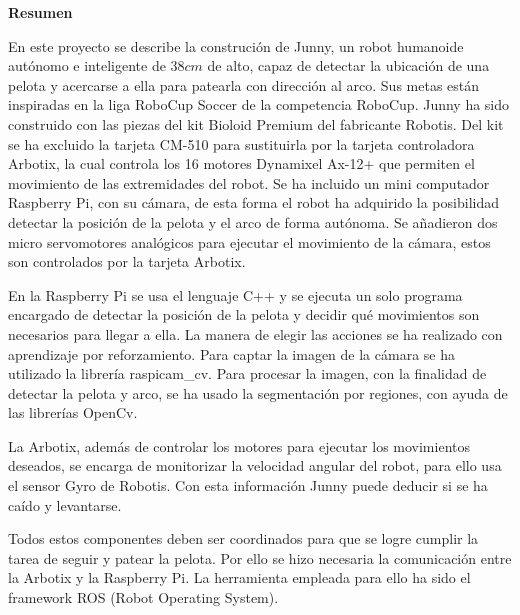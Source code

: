 \setcounter{page}{4}
\begin{center}
	{\bf Resumen}  %
\end{center}	


En este proyecto se describe la construción de Junny, un robot humanoide autónomo e inteligente de $38 cm $ de alto, capaz de detectar la ubicación de una pelota y acercarse a ella para patearla con dirección al arco. Sus metas están inspiradas en la liga RoboCup Soccer de la competencia RoboCup.
Junny ha sido construido con las piezas del kit Bioloid Premium del fabricante Robotis. Del kit se ha excluido la tarjeta CM-510 para sustituirla por la tarjeta controladora Arbotix, la cual controla los 16 motores Dynamixel Ax-12+ que permiten el movimiento de las extremidades del robot. Se ha incluido un mini computador Raspberry Pi, con su cámara, %
de esta forma el robot ha adquirido la posibilidad detectar la posición de la pelota y el arco de forma autónoma. Se añadieron dos micro servomotores analógicos para ejecutar el movimiento de la c\'amara, estos son controlados por la tarjeta Arbotix. 

En la Raspberry Pi se usa el lenguaje \gls{C++} y se ejecuta un solo programa encargado de detectar la posición de la pelota y decidir qué movimientos son necesarios para llegar a ella. La manera de elegir las acciones se ha realizado con aprendizaje por reforzamiento. Para captar la imagen de la cámara se ha utilizado la librería raspicam\_cv. Para procesar la imagen, con la finalidad de detectar la pelota y arco, se ha usado la segmentaci\'on por regiones, con ayuda de las librerías OpenCv. %

La Arbotix, además de controlar los motores para ejecutar los movimientos deseados, se encarga de monitorizar la velocidad angular del robot, para ello usa el sensor Gyro de Robotis. Con esta información Junny puede deducir si se ha caído y levantarse. 

Todos estos componentes deben ser coordinados para que se logre cumplir la tarea de seguir y patear la pelota. Por ello se hizo necesaria la comunicación entre la Arbotix y la Raspberry Pi. La herramienta 
empleada para ello ha sido el \gls{framework} \gls{ROS} (Robot Operating System). %

